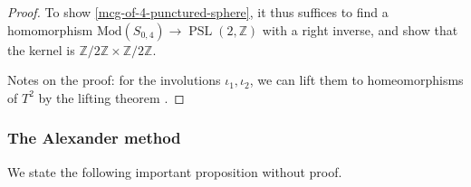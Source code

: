 \documentclass[reqno]{amsart}
\theoremstyle{definition}
\theoremstyle{remark}
\DeclareMathOperator{\PSL}{PSL}
\newcommand{\Mod}{{\mathrm{Mod}}}
\begin{document}
\begin{proof}
    To show \ref{mcg-of-4-punctured-sphere}, it
    thus suffices to find a homomorphism
    $\Mod \left( S_{0,4} \right) \to 
    \PSL \left( 2, \mathbb{Z} \right) $ with a right
    inverse, and show that the kernel
    is $\mathbb{Z} /2 \mathbb{Z} \times \mathbb{Z} / 2 \mathbb{Z}$.

    Notes on the proof: for the involutions
    $\iota_1, \iota_2$, we can lift them
    to homeomorphisms of $T^2$ by the lifting theorem
    \cite[Thm~4.1]{Bredon}. 
\end{proof}


\subsubsection{The Alexander method}

We state the following important proposition without proof.
\end{document}
